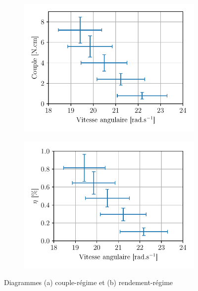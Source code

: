 \begin{figure}[h]
    \centering
    \begin{subfigure}{0.5\linewidth}
        \centering
        \includegraphics[width=\linewidth]{figures/couple-regime.pdf}
        \caption{}
        \label{fig:couple-regime}
    \end{subfigure}%
    \begin{subfigure}{0.5\linewidth}
        \centering
        \includegraphics[width=\linewidth]{figures/rendement-regime.pdf}
        \caption{}
        \label{fig:rend-regime}
    \end{subfigure}
    \caption{Diagrammes (a) couple-régime et (b) rendement-régime}
\end{figure}



